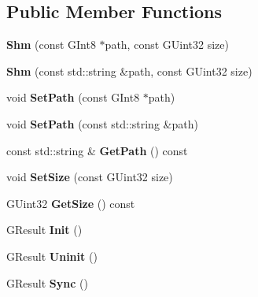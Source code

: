 \subsection*{Public Member Functions}
\begin{DoxyCompactItemize}
\item 
\hypertarget{class_shm_a37fabe66473698ab81513db7bcc5f7ac}{{\bfseries Shm} (const G\-Int8 $\ast$path, const G\-Uint32 size)}\label{class_shm_a37fabe66473698ab81513db7bcc5f7ac}

\item 
\hypertarget{class_shm_a8c2504cb03ebc12331da3c8da276658f}{{\bfseries Shm} (const std\-::string \&path, const G\-Uint32 size)}\label{class_shm_a8c2504cb03ebc12331da3c8da276658f}

\item 
\hypertarget{class_shm_a0bfe59af1d8925b1e09fd16c6060e6a0}{void {\bfseries Set\-Path} (const G\-Int8 $\ast$path)}\label{class_shm_a0bfe59af1d8925b1e09fd16c6060e6a0}

\item 
\hypertarget{class_shm_a892fdd13e0c051e8e0d5e154d573ab28}{void {\bfseries Set\-Path} (const std\-::string \&path)}\label{class_shm_a892fdd13e0c051e8e0d5e154d573ab28}

\item 
\hypertarget{class_shm_ac60b62ed292ab7f9deddc4e208d93441}{const std\-::string \& {\bfseries Get\-Path} () const }\label{class_shm_ac60b62ed292ab7f9deddc4e208d93441}

\item 
\hypertarget{class_shm_af256ba459390e95be16f508221d78436}{void {\bfseries Set\-Size} (const G\-Uint32 size)}\label{class_shm_af256ba459390e95be16f508221d78436}

\item 
\hypertarget{class_shm_abe391d38616be549409bba8ec74982c5}{G\-Uint32 {\bfseries Get\-Size} () const }\label{class_shm_abe391d38616be549409bba8ec74982c5}

\item 
\hypertarget{class_shm_a897f93c7828a5d54cb633cad72fcbcbf}{G\-Result {\bfseries Init} ()}\label{class_shm_a897f93c7828a5d54cb633cad72fcbcbf}

\item 
\hypertarget{class_shm_aa693abdb2aa7629e5a4adfd98ec4a158}{G\-Result {\bfseries Uninit} ()}\label{class_shm_aa693abdb2aa7629e5a4adfd98ec4a158}

\item 
\hypertarget{class_shm_a551920bc98263b6d6a31ee8ddab7429f}{G\-Result {\bfseries Sync} ()}\label{class_shm_a551920bc98263b6d6a31ee8ddab7429f}


\end{DoxyCompactItemize}
